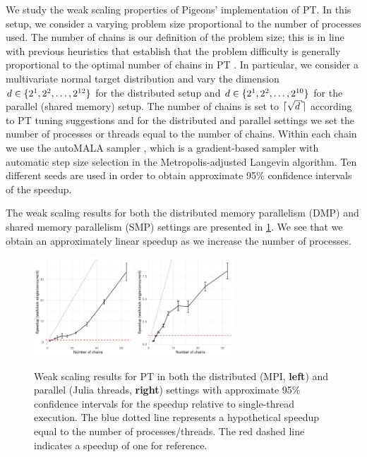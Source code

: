 We study the weak scaling properties of Pigeons' implementation of PT.
In this setup, we consider a varying problem size proportional to the number of processes used. 
The number of chains is our definition of the problem size; 
this is in line with previous heuristics that establish that the problem 
difficulty is generally proportional to the optimal number of chains in PT \cite{syed2021nrpt}.
In particular, we consider a multivariate normal target distribution 
and vary the dimension $d \in \cbra{2^1, 2^2, \ldots, 2^{12}}$ for the distributed setup and 
$d \in \cbra{2^1, 2^2, \ldots, 2^{10}}$ for the parallel (shared memory) setup. 
The number of chains is set to $\ceil{\sqrt{d}}$ according to PT tuning suggestions \cite{syed2021nrpt} 
and for the distributed and parallel settings we set the number of processes or threads equal 
to the number of chains.
Within each chain we use the autoMALA sampler \cite{biron2024automala}, which is a 
gradient-based sampler with automatic step size selection in the Metropolis-adjusted Langevin algorithm.
Ten different seeds are used in order to obtain approximate 95\% confidence intervals of 
the speedup.


The weak scaling results for both the distributed memory parallelism (DMP) and 
shared memory parallelism (SMP) settings are presented in \cref{fig:PT_scaling}. 
We see that we obtain an approximately linear speedup as we increase the number of processes. 

\begin{figure}[t]
    \centering
    \includegraphics[width=0.33\textwidth]{../img/speedup_distributed.pdf}
    \hspace{4em}
    \includegraphics[width=0.33\textwidth]{../img/speedup_parallel.pdf}
    \caption{
        Weak scaling results for PT in both the distributed (MPI, {\bf left}) 
        and parallel (Julia threads, {\bf right}) settings 
        with approximate 95\% confidence intervals for the speedup relative to single-thread execution.   
        The blue dotted line represents a hypothetical speedup equal to the 
        number of processes/threads. 
        The red dashed line indicates a speedup of one for reference.
    }
    \label{fig:PT_scaling}
\end{figure}


